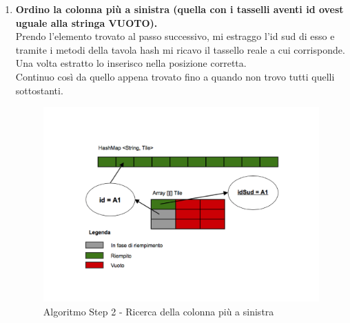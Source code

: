 \begin{enumerate}
		\item \textbf{Ordino la colonna più a sinistra (quella con i tasselli aventi id ovest uguale alla stringa VUOTO).} \\
Prendo l'elemento trovato al passo successivo, mi estraggo l'id sud di esso e tramite i metodi della tavola hash mi ricavo il tassello reale a cui corrisponde. \\
Una volta estratto lo inserisco nella posizione corretta. \\
Continuo così da quello appena trovato fino a quando non trovo tutti quelli sottostanti.
		\begin{figure}[htbp]
			\centering
			\includegraphics[width=15cm]{img/algpuzzle_step2.pdf}
			\caption{Algoritmo Step 2 - Ricerca della colonna più a sinistra}
			\label{Algoritmo Step 2 - Ricerca della colonna più a sinistra}
		\end{figure}


\end{enumerate}
